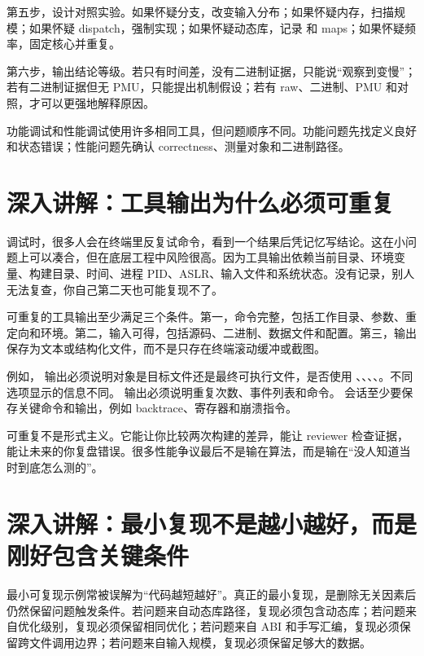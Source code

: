 第五步，设计对照实验。如果怀疑分支，改变输入分布；如果怀疑内存，扫描规模；如果怀疑 dispatch，强制实现；如果怀疑动态库，记录  和 maps；如果怀疑频率，固定核心并重复。

第六步，输出结论等级。若只有时间差，没有二进制证据，只能说“观察到变慢”；若有二进制证据但无 PMU，只能提出机制假设；若有 raw、二进制、PMU 和对照，才可以更强地解释原因。

\begin{keyidea}
功能调试和性能调试使用许多相同工具，但问题顺序不同。功能问题先找定义良好和状态错误；性能问题先确认 correctness、测量对象和二进制路径。
\end{keyidea}

\section{深入讲解：工具输出为什么必须可重复}

调试时，很多人会在终端里反复试命令，看到一个结果后凭记忆写结论。这在小问题上可以凑合，但在底层工程中风险很高。因为工具输出依赖当前目录、环境变量、构建目录、时间、进程 PID、ASLR、输入文件和系统状态。没有记录，别人无法复查，你自己第二天也可能复现不了。

可重复的工具输出至少满足三个条件。第一，命令完整，包括工作目录、参数、重定向和环境。第二，输入可得，包括源码、二进制、数据文件和配置。第三，输出保存为文本或结构化文件，而不是只存在终端滚动缓冲或截图。

例如， 输出必须说明对象是目标文件还是最终可执行文件，是否使用 、、、、。不同选项显示的信息不同。  输出必须说明重复次数、事件列表和命令。  会话至少要保存关键命令和输出，例如 backtrace、寄存器和崩溃指令。

可重复不是形式主义。它能让你比较两次构建的差异，能让 reviewer 检查证据，能让未来的你复盘错误。很多性能争议最后不是输在算法，而是输在“没人知道当时到底怎么测的”。

\section{深入讲解：最小复现不是越小越好，而是刚好包含关键条件}

最小可复现示例常被误解为“代码越短越好”。真正的最小复现，是删除无关因素后仍然保留问题触发条件。若问题来自动态库路径，复现必须包含动态库；若问题来自优化级别，复现必须保留相同优化；若问题来自 ABI 和手写汇编，复现必须保留跨文件调用边界；若问题来自输入规模，复现必须保留足够大的数据。

